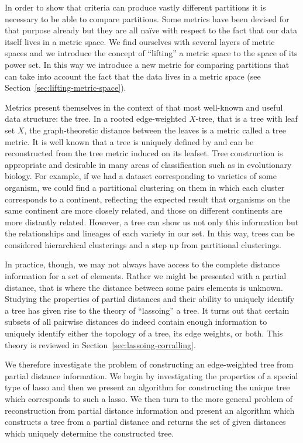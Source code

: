 In order to show that criteria can produce vastly different partitions it is
necessary to be able to compare partitions.  Some metrics have been devised
for that purpose already but they are all naïve with respect to the fact that
our data itself lives in a metric space.  We find ourselves with several
layers of metric spaces and we introduce the concept of ``lifting'' a metric
space to the space of its power set.  In this way we introduce a new metric
for comparing partitions that can take into account the fact that the data
lives in a metric space (see Section~\ref{sec:lifting-metric-space}).

Metrics present themselves in the context of that most well-known and useful
data structure: the tree.  In a rooted edge-weighted $X$-tree, that is a tree
with leaf set $X$, the graph-theoretic distance between the leaves is a metric
called a tree metric.  It is well known that a tree is uniquely defined by and
can be reconstructed from the tree metric induced on its leafset.  Tree
construction is appropriate and desirable in many areas of classification such
as in evolutionary biology.  For example, if we had a dataset corresponding to
varieties of some organism, we could find a partitional clustering on them in
which each cluster corresponds to a continent, reflecting the expected result
that organisms on the same continent are more closely related, and those on
different continents are more distantly related.  However, a tree can show us
not only this information but the relationships and lineages of each variety
in our set.  In this way, trees can be considered hierarchical clusterings and
a step up from partitional clusterings.

In practice, though, we may not always have access to the complete distance
information for a set of elements.  Rather we might be presented with a
partial distance, that is where the distance between some pairs elements is
unknown.  Studying the properties of partial distances and their ability to
uniquely identify a tree has given rise to the theory of ``lassoing'' a tree.
It turns out that certain subsets of all pairwise distances do indeed contain
enough information to uniquely identify either the topology of a tree, its
edge weights, or both.  This theory is reviewed in
Section~\ref{sec:lassoing-corralling}.

We therefore investigate the problem of constructing an edge-weighted tree
from partial distance information.  We begin by investigating the properties
of a special type of lasso and then we present an algorithm for constructing
the unique tree which corresponds to such a lasso.  We then turn to the more
general problem of reconstruction from partial distance information and
present an algorithm which constructs a tree from a partial distance and
returns the set of given distances which uniquely determine the constructed
tree.

